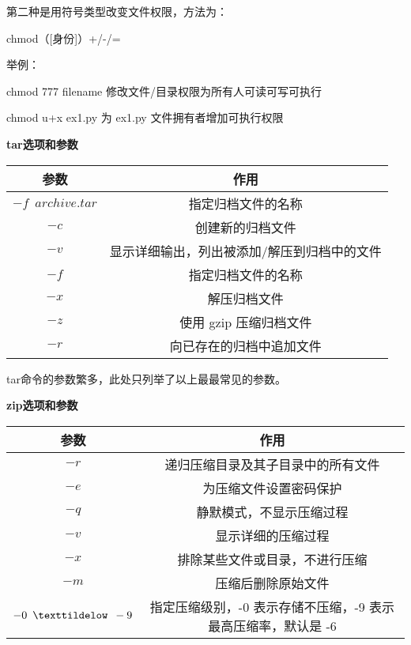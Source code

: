 第二种是用符号类型改变文件权限，方法为：

chmod\enspace （[身份]）\enspace +/-/=\enspace [permissions]

举例：

chmod 777 filename    修改文件/目录权限为所有人可读可写可执行

chmod u+x ex1.py        为 ex1.py 文件拥有者增加可执行权限

\begin{center}
\textbf{tar\enspace 选项和参数}

	\begin{tabular}{cc}
		\toprule[1.5pt]
		参数 & 作用\\
		\midrule[1pt]
		$  -f\enspace archive.tar $		&指定归档文件的名称\\
		$  -c $		&创建新的归档文件\\
		$  -v $		&显示详细输出，列出被添加/解压到归档中的文件 \\
		$  -f $		&指定归档文件的名称 \\
		$  -x $		&解压归档文件 \\
		$  -z $		&使用 gzip 压缩归档文件 \\
		$  -r $		&向已存在的归档中追加文件 \\
		\bottomrule[1.5pt]
	\end{tabular}
\end{center}

tar命令的参数繁多，此处只列举了以上最最常见的参数。

\begin{center}
\textbf{zip\enspace 选项和参数}

	\begin{tabular}{cc}
		\toprule[1.5pt]
		参数 & 作用\\
		\midrule[1pt]
		$  -r $		&递归压缩目录及其子目录中的所有文件\\
		$  -e $		&为压缩文件设置密码保护\\
		$  -q $		&静默模式，不显示压缩过程 \\
		$  -v $		&显示详细的压缩过程 \\
		$  -x $		&排除某些文件或目录，不进行压缩 \\
		$  -m $		&压缩后删除原始文件 \\
		$  -0\enspace \texttildelow \enspace -9 $		&指定压缩级别，-0 表示存储不压缩，-9 表示最高压缩率，默认是 -6 \\
		\bottomrule[1.5pt]
	\end{tabular}
\end{center}

